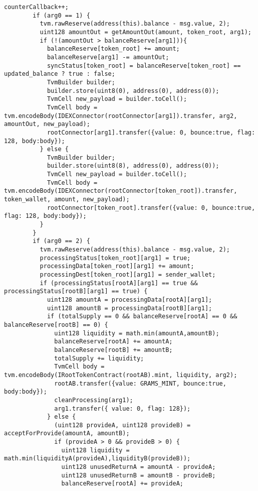 \begin{lstlisting}[firstnumber=248]
        counterCallback++;
        if (arg0 == 1) {
          tvm.rawReserve(address(this).balance - msg.value, 2);
          uint128 amountOut = getAmountOut(amount, token_root, arg1);
          if (!(amountOut > balanceReserve[arg1])){
            balanceReserve[token_root] += amount;
            balanceReserve[arg1] -= amountOut;
            syncStatus[token_root] = balanceReserve[token_root] == updated_balance ? true : false;
            TvmBuilder builder;
            builder.store(uint8(0), address(0), address(0));
            TvmCell new_payload = builder.toCell();
            TvmCell body = tvm.encodeBody(IDEXConnector(rootConnector[arg1]).transfer, arg2, amountOut, new_payload);
            rootConnector[arg1].transfer({value: 0, bounce:true, flag: 128, body:body});
          } else {
            TvmBuilder builder;
            builder.store(uint8(8), address(0), address(0));
            TvmCell new_payload = builder.toCell();
            TvmCell body = tvm.encodeBody(IDEXConnector(rootConnector[token_root]).transfer, token_wallet, amount, new_payload);
            rootConnector[token_root].transfer({value: 0, bounce:true, flag: 128, body:body});
          }
        }
        if (arg0 == 2) {
          tvm.rawReserve(address(this).balance - msg.value, 2);
          processingStatus[token_root][arg1] = true;
          processingData[token_root][arg1] += amount;
          processingDest[token_root][arg1] = sender_wallet;
          if (processingStatus[rootA][arg1] == true && processingStatus[rootB][arg1] == true) {
            uint128 amountA = processingData[rootA][arg1];
            uint128 amountB = processingData[rootB][arg1];
            if (totalSupply == 0 && balanceReserve[rootA] == 0 && balanceReserve[rootB] == 0) {
              uint128 liquidity = math.min(amountA,amountB);
              balanceReserve[rootA] += amountA;
              balanceReserve[rootB] += amountB;
              totalSupply += liquidity;
              TvmCell body = tvm.encodeBody(IRootTokenContract(rootAB).mint, liquidity, arg2);
              rootAB.transfer({value: GRAMS_MINT, bounce:true, body:body});
              cleanProcessing(arg1);
              arg1.transfer({ value: 0, flag: 128});
            } else {
              (uint128 provideA, uint128 provideB) = acceptForProvide(amountA, amountB);
              if (provideA > 0 && provideB > 0) {
                uint128 liquidity = math.min(liquidityA(provideA),liquidityB(provideB));
                uint128 unusedReturnA = amountA - provideA;
                uint128 unusedReturnB = amountB - provideB;
                balanceReserve[rootA] += provideA;

\end{lstlisting}
